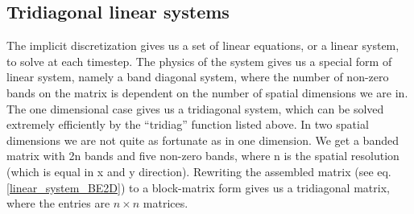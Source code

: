 % 

\subsection{Tridiagonal linear systems}
The implicit discretization gives us a set of linear equations, or a linear system, to solve at each timestep. 
The physics of the system gives us a special form of linear system, namely a band diagonal system, where the number of non-zero bands on the matrix is dependent on the number of spatial dimensions we are in. 
The one dimensional case gives us a tridiagonal system, which can be solved extremely efficiently by the ``tridiag'' function listed above.
In two spatial dimensions we are not quite as fortunate as in one dimension. We get a banded matrix with 2n bands and five non-zero bands, where n is the spatial resolution (which is equal in x and y direction). 
Rewriting the assembled matrix (see eq. \ref{linear_system_BE2D}) to a block-matrix form gives us a tridiagonal matrix, where the entries are $n\times n$ matrices. 


